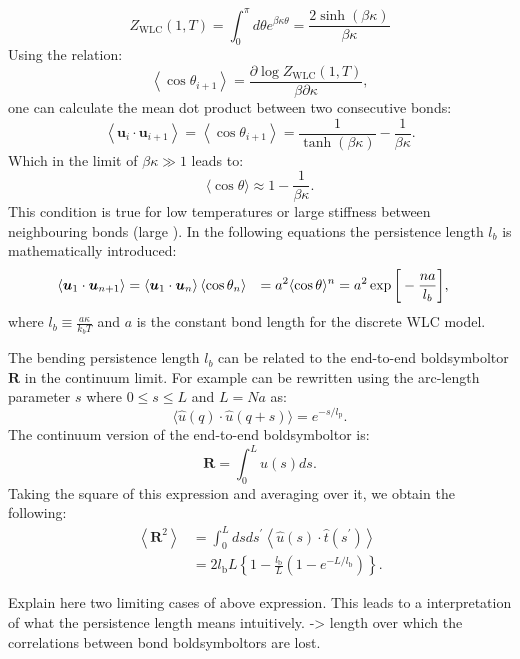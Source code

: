 \begin{equation}
    Z_{\mathrm{WLC}}(1, T)=\int_{0}^{\pi} d \theta e^{\beta \kappa \theta}=\frac{2 \sinh(\beta
    \kappa)}{\beta \kappa}
\end{equation}
Using the relation:
\begin{equation}
    \left\langle\cos \theta_{i+1}\right\rangle
    =\frac{\partial \log Z_{\mathrm{WLC}}(1, T)}{\beta \partial \kappa},
\end{equation}
one can calculate the mean dot product between two consecutive bonds:
\begin{equation}
    \left\langle\boldsymbol{u}_{i} \cdot \boldsymbol{u}_{i+1}\right\rangle
    = \left\langle\cos \theta_{i+1}\right\rangle
    = \frac{1}{\tanh(\beta \kappa)} - \frac{1}{\beta \kappa}.
\end{equation}
Which in the limit of $\beta \kappa \gg 1$ leads to:
\begin{equation}
    \langle\cos \theta\rangle \approx 1-\frac{1}{\beta \kappa}.
\end{equation}
This condition is true for low temperatures or large stiffness between neighbouring bonds (large \kappa). In the following equations the persistence length $l_b$ is mathematically introduced:
\begin{equation}
\begin{aligned}
    \left\langle\boldsymbol{u}_{1} \cdot \boldsymbol{u}_{n+1}\right\rangle
    &=\left\langle\boldsymbol{u}_{1} \cdot \boldsymbol{u}_{n}\right\rangle\left\langle\cos
    \theta_{n}\right\rangle
    &= a^{2}\langle\cos \theta\rangle^{n}
    &=a^{2} \exp \bigg{[} -\frac{n a}{l_{b}} \bigg{]},
\end{aligned}
\end{equation}
where $l_b \equiv \frac{a \kappa}{k_{b} T}$ and $a$ is the constant bond length for the discrete WLC model.

The bending persistence length $l_b$ can be related to the end-to-end boldsymboltor $\boldsymbol{R}$ in
the continuum limit. For example can be rewritten using the arc-length parameter $s$
where $0 \leq s \leq L$ and $L = Na$ as:
\begin{equation}
    \label{hoi}
    \langle\widehat{u}(q) \cdot \widehat{u}(q+s)\rangle= e^{-s / l_{\mathrm{p}}}.
\end{equation}
The continuum version of the end-to-end boldsymboltor is:
\begin{equation}
    \boldsymbol{R}=\int_{0}^{L} \widehat{u}(s) d s.
\end{equation}
Taking the square of this expression and averaging over it, we obtain the following:
\begin{equation}
\begin{aligned}
    \left\langle\boldsymbol{R}^{2}\right\rangle
    &= \int_{0}^{L} d s d s^{\prime}\left\langle\widehat{u}(s) \cdot
  \widehat{t}\left(s^{\prime}\right)\right\rangle \\
    &= 2 l_{\mathrm{b}} L\left\{1-\frac{l_{\mathrm{b}}}{L}\left(1-e^{-L /
l_{\mathrm{b}}}\right)\right\}.
\end{aligned}
\end{equation}

Explain here two limiting cases of above expression. This leads to a interpretation of
what the persistence length means intuitively. -> length over which the correlations
between bond boldsymboltors are lost.
